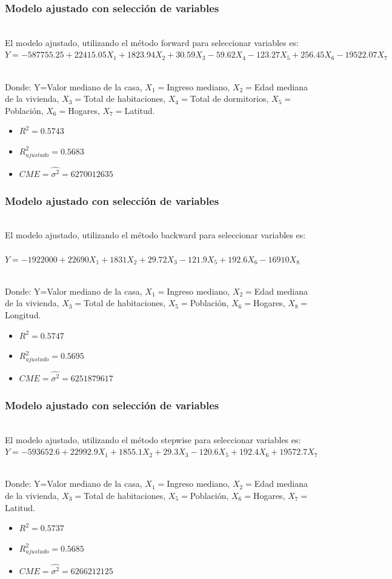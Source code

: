 \documentclass[12pt]{beamer}
\begin{document}
\begin{frame}
\frametitle{Modelo ajustado con selección de variables}
~\\ El modelo ajustado, utilizando el método forward para seleccionar variables es:
~\\ $Y=-587755.25+22415.05 X_{1}+1823.94 X_{2}+30.59 X_{3}-59.62 X_{4}-
123.27 X_{5}+256.45 X_{6}-
19522.07 X_{7}$

~\\ Donde: Y=Valor mediano de la casa, $X_{1}=$Ingreso mediano, $X_{2}=$Edad mediana de la vivienda, $X_{3}=$Total de habitaciones, $X_{4}=$Total de dormitorios, $X_{5}=$Población, $X_{6}=$Hogares, $X_{7}=$Latitud.
\begin{itemize}
\item $R^2=0.5743$
\item $R^2_{ajustado}=0.5683$
\item $CME=\hat{\sigma^2}=6270012635$
\end{itemize}
\end{frame}

\begin{frame}
\frametitle{Modelo ajustado con selección de variables}
~\\ El modelo ajustado, utilizando el método backward para seleccionar variables es:
~\\ $Y=-1922000 +22690 X_{1}+1831 X_{2}+29.72 X_{3}-
121.9 X_{5}+192.6 X_{6}
-16910 X_{8}$

~\\ Donde: Y=Valor mediano de la casa, $X_{1}=$Ingreso mediano, $X_{2}=$Edad mediana de la vivienda, $X_{3}=$Total de habitaciones, $X_{5}=$Población, $X_{6}=$Hogares, $X_{8}=$Longitud.
\begin{itemize}
\item $R^2=0.5747$
\item $R^2_{ajustado}=0.5695$
\item $CME=\hat{\sigma^2}=6251879617$
\end{itemize}
\end{frame}

\begin{frame}
\frametitle{Modelo ajustado con selección de variables}
~\\ El modelo ajustado, utilizando el método stepwise para seleccionar variables es:
~\\ $Y=-593652.6+22992.9 X_{1}+1855.1 X_{2}+29.3 X_{3}
-120.6 X_{5}+192.4 X_{6}+
19572.7 X_{7}$

~\\ Donde: Y=Valor mediano de la casa, $X_{1}=$Ingreso mediano, $X_{2}=$Edad mediana de la vivienda, $X_{3}=$Total de habitaciones, $X_{5}=$Población, $X_{6}=$Hogares, $X_{7}=$Latitud.
\begin{itemize}
\item $R^2=0.5737$
\item $R^2_{ajustado}=0.5685$
\item $CME=\hat{\sigma^2}=6266212125$
\end{itemize}
\end{frame}
\end{document}
